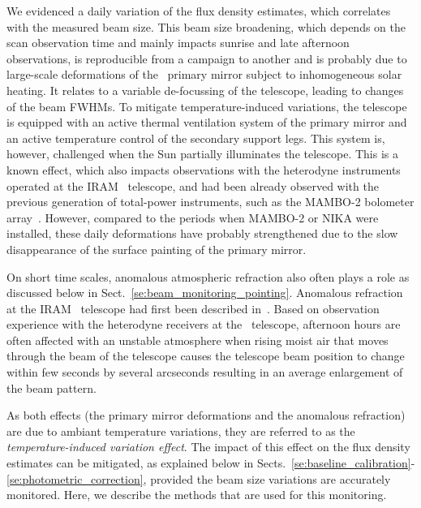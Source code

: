 We evidenced a daily variation of the flux density estimates,
which correlates with the measured beam size.
This beam size broadening, which depends on the
scan observation time and mainly impacts sunrise and late
afternoon observations, is reproducible from a campaign to another and 
is probably due to large-scale deformations of the \trentemetre\
primary mirror subject to inhomogeneous solar heating. {\lp It relates
to a variable de-focussing of the telescope, leading to changes of the
beam FWHMs.} {\lp To mitigate temperature-induced variations, the
telescope is equipped with an active thermal ventilation system of the
primary mirror and an active temperature control of the secondary
support legs. This system is, however, challenged when the Sun
partially illuminates the telescope.} {\lp This is a known effect,
which also impacts observations with the heterodyne instruments
operated at the IRAM \trentemetre\ telescope, and had been already
observed with the previous generation
of total-power instruments, such as the MAMBO-2 bolometer
array~\citep{Kreysa1999}.}
However,
compared to the periods when MAMBO-2 or NIKA were installed, these
daily deformations have probably strengthened due to {\lp the slow
disappearance of the surface painting of the primary mirror.}

On short time scales, anomalous atmospheric
refraction {\lp also often plays a role as discussed below in
Sect.~\ref{se:beam_monitoring_pointing}. Anomalous refraction at the
IRAM \trentemetre\ telescope had first
been described in~\citet{Altenhoff1987}.}
Based on observation experience with the heterodyne receivers at
the \trentemetre\ telescope, afternoon hours are often
affected with an unstable atmosphere when rising moist air that
moves through the beam of the telescope causes the telescope beam
position to change within few seconds by several arcseconds {\lp resulting
in an average enlargement of the beam pattern.}

{\lp As both effects (the primary mirror deformations and the
anomalous refraction) are due to ambiant temperature variations, they
are referred to as the \emph{temperature-induced variation effect}.}
The impact of this effect on the flux density estimates can be
mitigated, as explained below in
Sects.~\ref{se:baseline_calibration}-\ref{se:photometric_correction},
provided the beam size variations are accurately
monitored. Here, we describe the methods that are used for this
monitoring.



